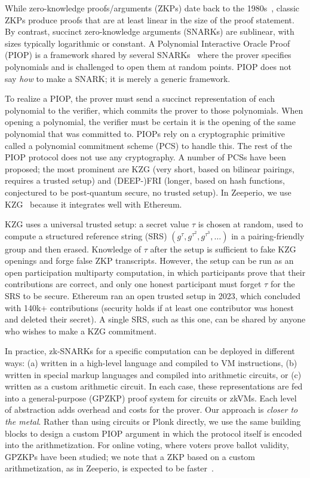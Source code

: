 While zero-knowledge proofs/arguments (ZKPs) date back to the 1980s~\cite{GMW86,BCC88}, classic ZKPs produce proofs that are at least linear in the size of the proof statement.
By contrast, succinct zero-knowledge arguments (SNARKs) are sublinear, with sizes typically logarithmic or constant.
A Polynomial Interactive Oracle Proof (PIOP) is a framework shared by several SNARKs~\cite{MBKM19,CHM+20,BFS20} where the prover specifies polynomials and is challenged to open them at random points.
PIOP does not say \textit{how} to make a SNARK; it is merely a generic framework.

To realize a PIOP, the prover must send a succinct representation of each polynomial to the verifier, which commits the prover to those polynomials.
When opening a polynomial, the verifier must be certain it is the opening of the same polynomial that was committed to.
PIOPs rely on a cryptographic primitive called a polynomial commitment scheme (PCS) to handle this.
The rest of the PIOP protocol does not use any cryptography.
A number of PCSs have been proposed; the most prominent are KZG (very short, based on bilinear pairings, requires a trusted setup) and (DEEP-)FRI (longer, based on hash functions, conjectured to be post-quantum secure, no trusted setup).
In Zeeperio, we use KZG~\cite{KZG10} because it integrates well with Ethereum.

KZG uses a universal trusted setup: a secret value $\tau$ is chosen at random, used to compute a structured reference string (SRS) $(g^\tau, g^{\tau^2},g^{\tau^3},\ldots)$ in a pairing-friendly group and then erased.
Knowledge of $\tau$ after the setup is sufficient to fake KZG openings and forge false ZKP transcripts.
However, the setup can be run as an open participation multiparty computation, in which participants prove that their contributions are correct, and only one honest participant must forget $\tau$ for the SRS to be secure.
Ethereum ran an open trusted setup in 2023, which concluded with 140k+ contributions (security holds if at least one contributor was honest and deleted their secret).
A single SRS, such as this one, can be shared by anyone who wishes to make a KZG commitment.

In practice, zk-SNARKs for a specific computation can be deployed in different ways: (a) written in a high-level language and compiled to VM instructions, (b) written in special markup languages and compiled into arithmetic circuits, or (c) written as a custom arithmetic circuit.
In each case, these representations are fed into a general-purpose (GPZKP) proof system for circuits or zkVMs.
Each level of abstraction adds overhead and costs for the prover.
Our approach is \emph{closer to the metal}.
Rather than using circuits or Plonk directly, we use the same building blocks to design a custom PIOP argument in which the protocol itself is encoded into the arithmetization. For online voting, where voters prove ballot validity, GPZKPs have been studied; we note that a ZKP based on a custom arithmetization, as in Zeeperio, is expected to be faster~\cite{HKJR24}.


